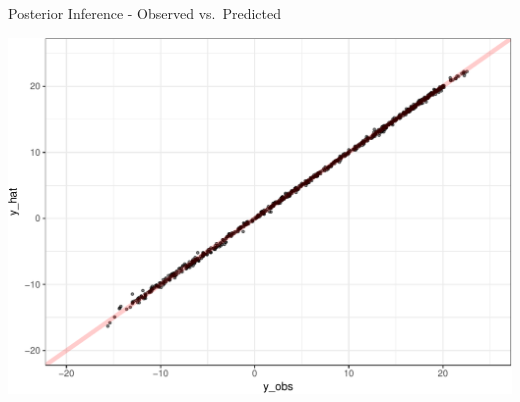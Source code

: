 \documentclass[11pt,ignorenonframetext,]{beamer}
\begin{document}
\begin{frame}{Posterior Inference - Observed vs.~Predicted}

\vspace{4mm}

\begin{center}\includegraphics[width=\textwidth]{Lec23_files/figure-beamer/unnamed-chunk-10-1} \end{center}

\end{frame}
\end{document}
